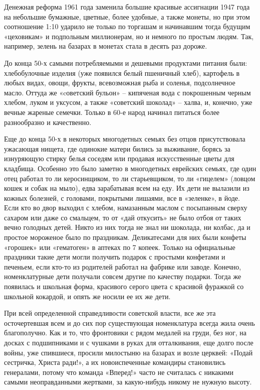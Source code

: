 Денежная реформа 1961 года заменила большие красивые ассигнации 1947 года на
небольшие бумажные, цветные, более удобные, а также монеты, но при этом
соотношение 1:10 ударило не только по торгашам и начинавшим тогда будущим
«цеховикам» и подпольным миллионерам, но и немного по простым людям. Так,
например, зелень на базарах в монетах стала в десять раз дороже. 

До конца 50-х самыми потребляемыми и дешевыми продуктами питания были:
хлебобулочные изделия (уже появился белый пшеничный хлеб), картофель в любых
видах, овощи, фрукты, всевозможная рыба и соленья, подсолнечное масло. Оттуда
же «cоветский бульон» – кипяченая вода с покрошенным черным хлебом, луком и
уксусом, а также «советский шоколад» – халва, и, конечно, уже вечные жареные
семечки. Только в 60-е народ начинал питаться более разнообразно и качественно. 

Еще до конца 50-х в некоторых многодетных семьях без отцов присутствовала
ужасающая нищета, где одинокие матери бились за выживание, борясь за изнуряющую
стирку белья соседям или продавая искусственные цветы для кладбища. Особенно
это было заметно в многодетных еврейских семьях, где один отец работал то ли
керосинщиком, то ли старьевщиком, то ли «гицелем» (ловцом кошек и собак на
мыло), едва зарабатывая всем на еду. Их дети не вылазили из кожных болезней, с
головами, покрытыми лишаями, все в «зеленке», в йоде. Если кто во двор выходил
с хлебом, намазанным маслом с посыпанным сверху сахаром или даже со смальцем,
то от «дай откусить» не было отбоя от таких вечно голодных детей. Никто из них
тогда не знал ни шоколада, ни колбас, да и простое мороженое было по
праздникам. Деликатесами для них были конфеты «горошек» или «гематоген» в
аптеках по 7 копеек. Только на официальные праздники такие дети могли получить
подарок с простыми конфетами и печеньем, если кто-то из родителей работал на
фабрике или заводе. Конечно, номенклатурные дети получали совсем другие по
качеству подарки. Тогда же появилась и школьная форма, красивого серого цвета с
красивой фуражкой со школьной кокардой, и опять же носили ее их же дети. 

При всей определенной справедливости советской власти, все же эта осточертевшая
всем и до сих пор существующая номенклатура всегда жила очень благополучно. Как
и то, что фронтовики с рядом медалей на груди, без ног, на досках с
подшипниками и с чушками в руках для отталкивания, еще долго после войны, уже
спившиеся, просили милостыню на базарах и возле церквей: «Подай сестричка,
Христа ради!», а их новоиспеченные командиры становились генералами, потому что
команда «Вперед!» часто не считалась с никакими самыми неоправданными жертвами,
за какую-нибудь никому не нужную высоту.

